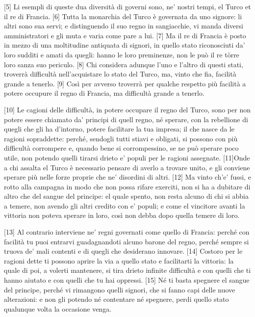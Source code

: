 {[}5{]} Li esempli di queste dua diversità di governi sono, ne' nostri
tempi, el Turco et il re di Francia. {[}6{]} Tutta la monarchia del
Turco è governata da uno signore: li altri sono sua servi; e
distinguendo il suo regno in sangiacchie, vi manda diversi
amministratori e gli muta e varia come pare a lui. {[}7{]} Ma il re di
Francia è posto in mezzo di una moltitudine antiquata di signori, in
quello stato riconosciuti da' loro sudditi e amati da quegli: hanno le
loro preminenze, non le può il re tòrre loro sanza suo periculo. {[}8{]}
Chi considera adunque l'uno e l'altro di questi stati, troverrà
difficultà nell'acquistare lo stato del Turco, ma, vinto che fia,
facilità grande a tenerlo. {[}9{]} Così per avverso troverrà per qualche
respetto più facilità a potere occupure il regno di Francia, ma
difficultà grande a tenerlo.

{[}10{]} Le cagioni delle difficultà, in potere occupare il regno del
Turco, sono per non potere essere chiamato da' principi di quell regno,
né sperare, con la rebellione di quegli che gli ha d'intorno, potere
facilitare la tua impresa; il che nasce da le ragioni sopraddette:
perché, sendogli tutti stiavi e obligati, si possono con più difficultà
corrompere e, quando bene si corrompessino, se ne può sperare poco
utile, non potendo quelli tirarsi drieto e' populi per le ragioni
assegnate. {[}11{]}Onde a chi assalta el Turco è necessario pensare di
averlo a trovare unito, e gli conviene sperare più nelle forze proprie
che ne' disordini di altri. {[}12{]} Ma vinto ch'e' fussi, e rotto alla
campagna in modo che non possa rifare exerciti, non si ha a dubitare di
altro che del sangue del principe: el quale spento, non resta alcuno di
chi si abbia a temere, non avendo gli altri credito con e' populi; e
come el vincitore avanti la vittoria non poteva sperare in loro, così
non debba dopo quella temere di loro.

{[}13{]} Al contrario interviene ne' regni governati come quello di
Francia: perché con facilità tu puoi entrarvi guadagnandoti alcuno
barone del regno, perché sempre si truova de' mali contenti e di quegli
che desiderano innovare. {[}14{]} Costoro per le ragioni dette ti
possono aprire la via a quello stato e facilitarti la vittoria: la quale
di poi, a volerti mantenere, si tira drieto infinite difficultà e con
quelli che ti hanno aiutato e con quelli che tu hai oppressi. {[}15{]}
Né ti basta spegnere el sangue del principe, perché vi rimangono quelli
signori, che si fanno capi delle nuove alterazioni: e non gli potendo né
contentare né spegnere, perdi quello stato qualunque volta la occasione
venga.

